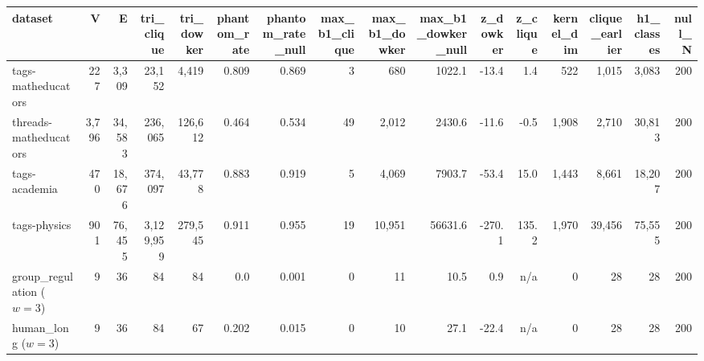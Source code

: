 \begin{tabular}{lrrrrrrrrrrrrrrr}
\toprule
dataset & V & E & tri\_clique & tri\_dowker & phantom\_rate & phantom\_rate\_null & max\_b1\_clique & max\_b1\_dowker & max\_b1\_dowker\_null & z\_dowker & z\_clique & kernel\_dim & clique\_earlier & h1\_classes & null\_N \\
\midrule
tags-matheducators & 227 & 3,309 & 23,152 & 4,419 & 0.809 & 0.869 & 3 & 680 & 1022.1 & -13.4 & 1.4 & 522 & 1,015 & 3,083 & 200 \\
threads-matheducators & 3,796 & 34,583 & 236,065 & 126,612 & 0.464 & 0.534 & 49 & 2,012 & 2430.6 & -11.6 & -0.5 & 1,908 & 2,710 & 30,813 & 200 \\
tags-academia & 470 & 18,676 & 374,097 & 43,778 & 0.883 & 0.919 & 5 & 4,069 & 7903.7 & -53.4 & 15.0 & 1,443 & 8,661 & 18,207 & 200 \\
tags-physics & 901 & 76,455 & 3,129,959 & 279,545 & 0.911 & 0.955 & 19 & 10,951 & 56631.6 & -270.1 & 135.2 & 1,970 & 39,456 & 75,555 & 200 \\
group\_regulation ($w{=}3$) & 9 & 36 & 84 & 84 & 0.0 & 0.001 & 0 & 11 & 10.5 & 0.9 & n/a & 0 & 28 & 28 & 200 \\
human\_long ($w{=}3$) & 9 & 36 & 84 & 67 & 0.202 & 0.015 & 0 & 10 & 27.1 & -22.4 & n/a & 0 & 28 & 28 & 200 \\
\bottomrule
\end{tabular}
